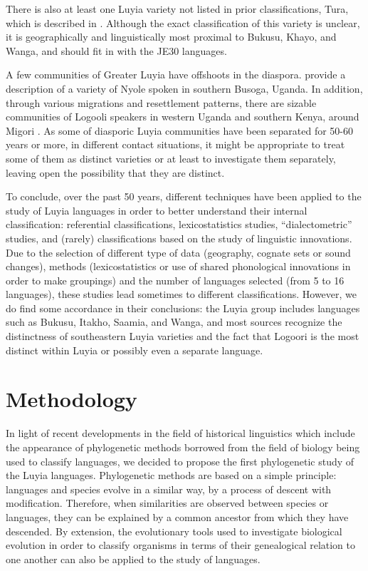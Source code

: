 \documentclass[output=paper]{langscibook}
\begin{document}
There is also at least one Luyia variety not listed in prior classifications, Tura, which is described in \citet{marlo_tura_2008}. Although the exact classification of this variety is unclear, it is geographically and linguistically most proximal to Bukusu, Khayo, and Wanga, and should fit in with the JE30 languages. 

A few communities of Greater Luyia have offshoots in the diaspora. \citet{marlo_sketch_2017} provide a description of a variety of Nyole spoken in southern Busoga, Uganda. In addition, through various migrations and resettlement patterns, there are sizable communities of Logooli speakers in western Uganda and southern Kenya, around Migori \citep[70]{chavasu_british_1997,heine_language_1980}. As some of diasporic Luyia communities have been separated for 50-60 years or more, in different contact situations, it might be appropriate to treat some of them as distinct varieties or at least to investigate them separately, leaving open the possibility that they are distinct.

\begin{sloppypar}
To conclude, over the past 50 years, different techniques have been applied to the study of Luyia languages in order to better understand their internal classification: referential classifications, lexicostatistics studies, “dialectometric” studies, and (rarely) classifications based on the study of linguistic innovations. Due to the selection of different type of data (geography, cognate sets or sound changes), methods (lexicostatistics or use of shared phonological innovations in order to make groupings) and the number of languages selected (from 5 to 16 languages), these studies lead sometimes to different classifications. However, we do find some accordance in their conclusions: the Luyia group includes languages such as Bukusu, Itakho, Saamia, and Wanga, and most sources recognize the distinctness of southeastern Luyia varieties and the fact that Logoori is the most distinct within Luyia or possibly even a separate language.
\end{sloppypar}

\section{Methodology}
\label{sec:3:Methodology}

In light of recent developments in the field of historical linguistics which include the appearance of phylogenetic methods borrowed from the field of biology being used to classify languages, we decided to propose the first phylogenetic study of the Luyia languages. Phylogenetic methods are based on a simple principle: languages and species evolve in a similar way, by a process of descent with modification. Therefore, when similarities are observed between species or languages, they can be explained by a common ancestor from which they have descended. By extension, the evolutionary tools used to investigate biological evolution in order to classify organisms in terms of their genealogical relation to one another can also be applied to the study of languages.
\end{document}
